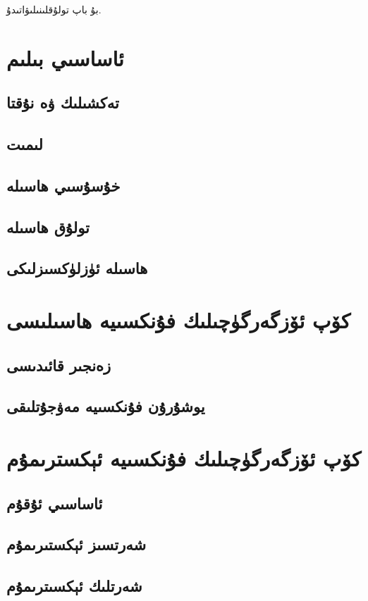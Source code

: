 بۇ باپ تولۇقلىنىلىۋاتىدۇ.
\section{ئاساسىي بىلىم}
\subsection{تەكشىلىك ۋە نۇقتا}
\subsection{لىمىت}
\subsection{خۇسۇسىي ھاسىلە}
\subsection{تولۇق ھاسىلە}
\subsection{ھاسىلە ئۈزلۈكسىزلىكى}
\section{كۆپ ئۆزگەرگۈچىلىك فۇنكسىيە ھاسىلىسى}
\subsection{زەنجىر قائىدىسى}
\subsection{يوشۇرۇن فۇنكسىيە مەۋجۇتلىقى}

\section{كۆپ ئۆزگەرگۈچىلىك فۇنكسىيە ئېكسترىمۇم }
\subsection{ئاساسىي ئۇقۇم}
\subsection{شەرتسىز ئېكستىرىمۇم}
\subsection{شەرتلىك ئېكسىترىمۇم}


